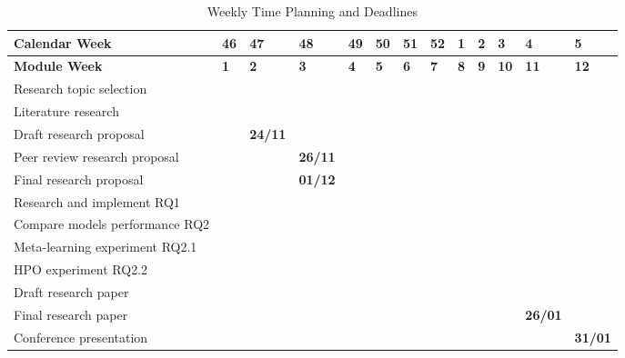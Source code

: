 \documentclass{sig-alternate-br}
\begin{document}
\begin{table*}[]
\renewcommand{\arraystretch}{1.25}
\caption{Weekly Time Planning and Deadlines}
\label{table:planning}
\centering
\begin{tabular}{|l|l|l|l|l|l|l|l|l|l|l|l|l|}
\hline
\textbf{Calendar Week} & \textbf{46} & \textbf{47} & \textbf{48} & \textbf{49} & \textbf{50} & \textbf{51} & \textbf{52} & \textbf{1} & \textbf{2} & \textbf{3} & \textbf{4} & \textbf{5} \\ \hline
\textbf{Module Week} & \textbf{1} & \textbf{2} & \textbf{3} & \textbf{4} & \textbf{5} & \textbf{6} & \textbf{7} & \textbf{8} & \textbf{9} & \textbf{10} & \textbf{11} & \textbf{12} \\ \hline
Research topic selection & \cellcolor[HTML]{C0C0C0}{\color[HTML]{333333} } &  &  &  &  &  &  &  &  &  &  &  \\ \hline
Literature research & \cellcolor[HTML]{C0C0C0}{\color[HTML]{000000} } & \cellcolor[HTML]{C0C0C0}{\color[HTML]{000000} } & \cellcolor[HTML]{C0C0C0}{\color[HTML]{000000} } &  &  &  &  &  &  &  &  &  \\ \hline
Draft research proposal &  & \cellcolor[HTML]{C0C0C0}\textbf{24/11} &  &  &  &  &  &  &  &  &  &  \\ \hline
Peer review research proposal &  &  & \cellcolor[HTML]{C0C0C0}\textbf{26/11} &  &  &  &  &  &  &  &  &  \\ \hline
Final research proposal &  &  & \cellcolor[HTML]{C0C0C0}\textbf{01/12} &  &  &  &  &  &  &  &  &  \\ \hline
Research and implement RQ1 &  &  & \cellcolor[HTML]{C0C0C0} & \cellcolor[HTML]{C0C0C0} & \cellcolor[HTML]{C0C0C0} &  &  &  &  &  &  &  \\ \hline
Compare models performance RQ2 &  &  &  &  &  & \cellcolor[HTML]{C0C0C0} & \cellcolor[HTML]{C0C0C0} & \cellcolor[HTML]{C0C0C0} &  &  &  &  \\ \hline
Meta-learning experiment RQ2.1 &  &  &  &  &  &  & \cellcolor[HTML]{C0C0C0} &  &  &  &  &  \\ \hline
HPO experiment RQ2.2 &  &  &  &  &  &  &  & \cellcolor[HTML]{C0C0C0}{\color[HTML]{000000} } &  &  &  &  \\ \hline
Draft research paper &  &  &  &  &  &  & & \cellcolor[HTML]{C0C0C0}{\color[HTML]{000000} } & \cellcolor[HTML]{C0C0C0}{\color[HTML]{000000} } & \cellcolor[HTML]{C0C0C0}{\color[HTML]{000000} \textbf{19/01}} &  &  \\ \hline
Final research paper &  &  &  &  &  &  &  &  &  &  & \cellcolor[HTML]{C0C0C0}\textbf{26/01} &  \\ \hline
Conference presentation &  &  &  &  &  &  &  &  &  &  &  & \cellcolor[HTML]{C0C0C0}\textbf{31/01} \\ \hline
\end{tabular}
\end{table*}
\end{document}
